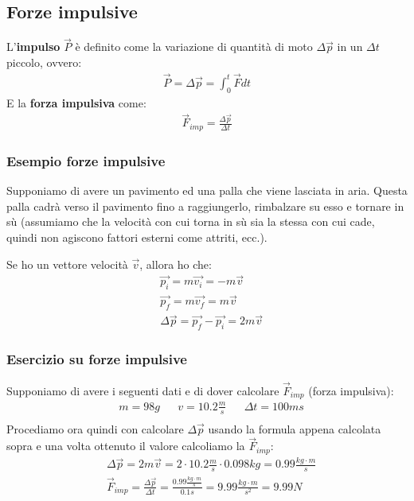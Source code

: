     \subsection{Forze impulsive}
        L'\textbf{impulso} $\vec{P}$ è definito come la variazione di quantità di moto $\Delta\vec{p}$ in un $\Delta t$ piccolo, ovvero:
        \begin{align*}
            \vec{P}=\Delta\vec{p}=\int_0^t{\vec{F}dt}
        \end{align*}
        E la \textbf{forza impulsiva} come:
        \begin{align*}
            \vec{F}_{imp}=\frac{\Delta\vec{p}}{\Delta t}
        \end{align*}

        \subsubsection{Esempio forze impulsive}
            Supponiamo di avere un pavimento ed una palla che viene lasciata in aria. Questa palla cadrà verso il pavimento fino a raggiungerlo, rimbalzare su esso e tornare in sù (assumiamo che la velocità con cui torna in sù sia la stessa con cui cade, quindi non agiscono fattori esterni come attriti, ecc.).


            Se ho un vettore velocità $\vec{v}$, allora ho che:
            \begin{align*}
                &\vec{p_i}=m\vec{v_i}=-m\vec{v}\\
                &\vec{p_f}=m\vec{v_f}=m\vec{v}\\
                &\Delta\vec{p}=\vec{p_f}-\vec{p_i}=2m\vec{v}
            \end{align*}

        \subsubsection{Esercizio su forze impulsive}
            Supponiamo di avere i seguenti dati e di dover calcolare $\vec{F}_{imp}$ (forza impulsiva):
            \begin{align*}
                &m=98g&&v=10.2\frac{m}{s}&&\Delta t=100ms\\
            \end{align*}
            Procediamo ora quindi con calcolare $\Delta\vec{p}$ usando la formula appena calcolata sopra e una volta ottenuto il valore calcoliamo la $\vec{F}_{imp}$:
            \begin{align*}
                &\Delta\vec{p}=2m\vec{v}=2\cdot 10.2\frac{m}{s}\cdot 0.098kg=0.99\frac{kg\cdot m}{s}\\
                &\vec{F}_{imp}=\frac{\Delta\vec{p}}{\Delta t}=\frac{0.99\frac{kg\cdot m}{s}}{0.1s}=9.99\frac{kg\cdot m}{s^2}=9.99N
            \end{align*}

